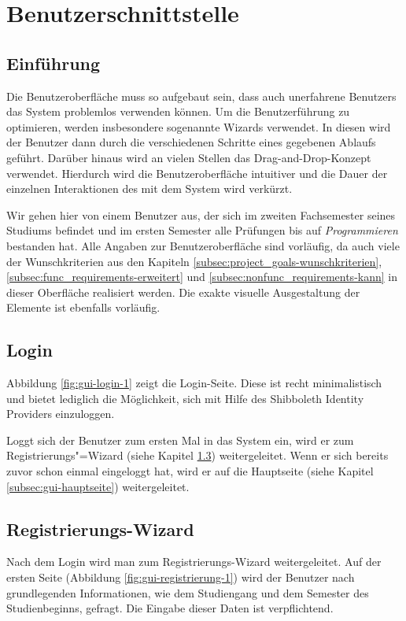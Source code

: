 \section{Benutzerschnittstelle}

\subsection{Einführung}
Die Benutzeroberfläche muss so aufgebaut sein, dass auch unerfahrene \glspl{Benutzer} das System problemlos verwenden können.
Um die Benutzerführung zu optimieren, werden insbesondere sogenannte \glspl{Wizard} verwendet. In diesen wird der Benutzer dann durch die verschiedenen Schritte eines gegebenen Ablaufs geführt. Darüber hinaus wird an vielen Stellen das \gls{Drag-and-Drop}-Konzept verwendet.
Hierdurch wird die Benutzeroberfläche intuitiver und die Dauer der einzelnen Interaktionen des  mit dem System wird verkürzt.

Wir gehen hier von einem \gls{Benutzer} aus, der sich im zweiten Fachsemester seines Studiums befindet und im ersten Semester alle Prüfungen bis auf \emph{Programmieren} bestanden hat.
Alle Angaben zur Benutzeroberfläche sind vorläufig, da auch viele der Wunschkriterien aus den Kapiteln \ref{subsec:project_goals-wunschkriterien}, \ref{subsec:func_requirements-erweitert} und \ref{subsec:nonfunc_requirements-kann} in dieser Oberfläche realisiert werden. Die exakte visuelle Ausgestaltung der Elemente ist ebenfalls vorläufig.
\subsection{Login}
Abbildung \ref{fig:gui-login-1} zeigt die Login-Seite. Diese ist recht minimalistisch und bietet lediglich die Möglichkeit, sich mit Hilfe des \gls{Shibboleth Identity Provider}s einzuloggen.

Loggt sich der \gls{Benutzer} zum ersten Mal in das System ein, wird er zum Registrierungs"=\gls{Wizard} (siehe Kapitel \ref{subsec:gui-registrierung}) weitergeleitet. Wenn er sich bereits zuvor schon einmal eingeloggt hat, wird er auf die Hauptseite (siehe Kapitel \ref{subsec:gui-hauptseite}) weitergeleitet.
\subsection{Registrierungs-Wizard}
\label{subsec:gui-registrierung}
Nach dem Login wird man zum Registrierungs-\gls{Wizard} weitergeleitet. Auf der ersten Seite (Abbildung \ref{fig:gui-registrierung-1}) wird der \gls{Benutzer} nach grundlegenden Informationen, wie dem \gls{Studiengang} und dem \gls{Semester des Studienbeginns}, gefragt. Die Eingabe dieser Daten ist verpflichtend.

